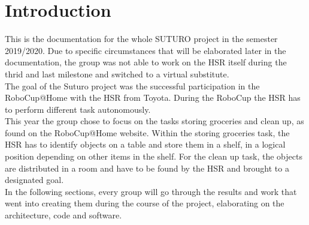 \documentclass[main.tex]{subfiles}
\begin{document}
	\chapter{Introduction}

This is the documentation for the whole SUTURO project in the semester 2019/2020. Due to specific circumstances that will be elaborated later in the documentation, the group was not able to work on the HSR itself during the thrid and last milestone and switched to a virtual substitute.\\
	The goal of the Suturo project was the successful participation in the RoboCup@Home with the HSR from Toyota. During the RoboCup the HSR has to perform different task autonomously.\\ 
	This year the group chose to focus on the tasks storing groceries and clean up, as found on the RoboCup@Home website. Within the storing groceries task, the HSR has to identify objects on a table and store them in a shelf, in a logical position depending on other items in the shelf. For the clean up task, the objects are distributed in a room and have to be found by the HSR and brought to a designated goal.\\
	In the following sections, every group will go through the results and work that went into creating them during the course of the project, elaborating on the architecture, code and software.\\
	
\end{document}

